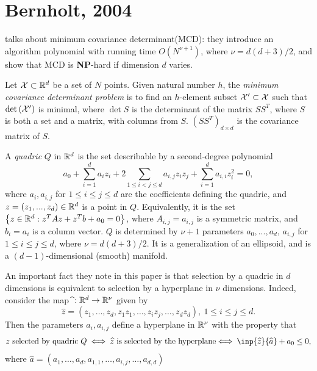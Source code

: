 \documentclass{article}
\begin{document}
\section{Bernholt, 2004}
\cite{bernholt2004complexity} talks about minimum covariance determinant(MCD): they introduce an algorithm polynomial with running time $O(N^{\nu+1})$, where $\nu = d(d+3)/2$, and show that MCD is \textbf{NP}-hard if dimension $d$ varies.

\begin{definition}[MCD]
Let $\mathcal{X}\subset \mathbb{R}^d$ be a set of $N$ points. Given natural number $h$, the \textit{minimum covariance determinant problem} is to find an $h$-element subset $\mathcal{X}'\subset \mathcal{X}$ such that $\text{det}\left(\mathcal{X}'\right)$ is minimal, where $\det{S}$ is the determinant of the matrix $SS^T$, where $S$ is both a set and a matrix, with columns from $S$. $(SS^T)_{d\times d}$ is the covariance matrix of $S$.
\end{definition}

\begin{definition}[Quadric]
A \textit{quadric} $Q$ in $\mathbb{R}^d$ is the set describable by a second-degree polynomial
\begin{equation}
    a_0 + \sum_{i=1}^d a_i z_i + 2\sum_{1\leq i< j\leq d} a_{i,j} z_i z_j + \sum_{i = 1}^d a_{i,i} z_i^2 = 0,
\end{equation}
where $a_i, a_{i,j}$ for $1\leq i\leq j\leq d$ are the coefficients defining the quadric, and $z = (z_1,...,z_d)\in \mathbb{R}^d$ is a point in $Q$.
Equivalently, it is the set $\left\{z\in \mathbb{R}^d : z^T A z + z^T b + a_0 = 0\right\}$, where $A_{i,j} = a_{i,j}$ is a symmetric matrix, and $b_i = a_i$ is a column vector. $Q$ is determined by $\nu+1$ parameters $a_0,...,a_d$,  $a_{i,j}$ for $1\leq i\leq j\leq d$, where $\nu = d(d+3)/2$. It is a generalization of an ellipsoid, and is a $(d-1)$-dimensional (smooth) manifold.
\end{definition}

An important fact they note in this paper is that selection by a quadric in $d$ dimensions is equivalent to selection by a hyperplane in $\nu$ dimensions. Indeed, consider the map $\mathbf{\widehat{}}: \mathbb{R}^d \to \mathbb{R}^\nu$ given by
$$\widehat{z} = (z_1,\dots,z_d, z_1z_1,\dots,z_iz_j,\dots,z_dz_d),\ 1\leq i\leq j\leq d.$$
Then the parameters $a_i,a_{i,j}$ define a hyperplane in $\mathbb{R}^\nu$ with the property that 
$$ \text{$z$ selected by quadric $Q \iff \widehat{z} $ is selected by the hyperplane$ \iff \inp{\widehat{z}}{\widehat{a}} + a_0\leq 0$}, $$
where $\widehat{a} = (a_1,\dots,a_d, a_{1,1},\dots,a_{i,j},\dots,a_{d,d})$
\end{document}
